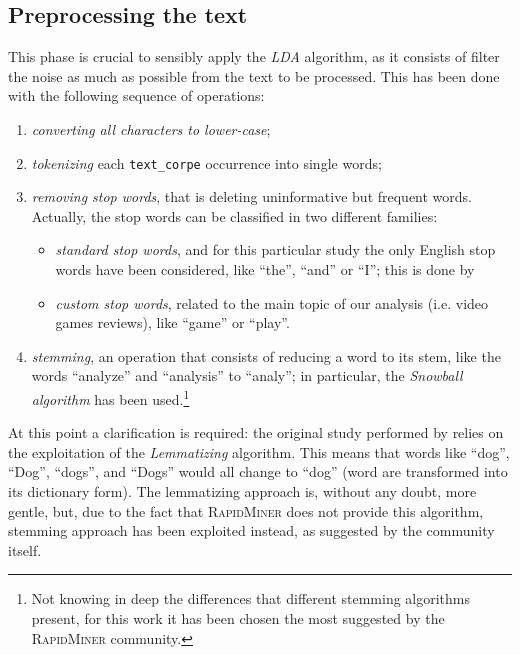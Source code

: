 \documentclass[a4paper]{article}
\begin{document}
	 	\subsection{Preprocessing the text}
	 		This phase is crucial to sensibly apply the \emph{LDA} algorithm, as it consists of filter the noise as much as possible from the text to be processed. This has been done with the following sequence of operations:
	 		\begin{enumerate}
	 			\item \emph{converting all characters to lower-case};
	 			\item \emph{tokenizing} each \verb*|text_corpe| occurrence into single words;
	 			\item \emph{removing stop words}, that is deleting uninformative but frequent words. Actually, the stop words can be classified in two different families:
	 			\begin{itemize}
	 				\item \emph{standard stop words}, and for this particular study the only English stop words have been considered, like ``the'', ``and'' or ``I''; this is done by 
	 				\item \emph{custom stop words}, related to the main topic of our analysis (i.e. video games reviews), like ``game'' or ``play''.
	 			\end{itemize}
 				\item \emph{stemming}, an operation that consists of reducing a word to its stem, like the words ``analyze'' and ``analysis'' to ``analy''; in particular, the \emph{Snowball algorithm} has been used.\footnote{Not knowing in deep the differences that different stemming algorithms present, for this work it has been chosen the most suggested by the \textsc{RapidMiner} community.}
	 		\end{enumerate}
 			At this point a clarification is required: the original study performed by \citeauthor{article:muller} relies on the exploitation of the \emph{Lemmatizing} algorithm. This means that words like ``dog'', ``Dog'', ``dogs'', and ``Dogs'' would all change to ``dog'' (word are transformed into its dictionary form). The lemmatizing approach is, without any doubt, more gentle, but, due to the fact that \textsc{RapidMiner} does not provide this algorithm, stemming approach has been exploited instead, as suggested by the community itself.
	 		
\end{document}
